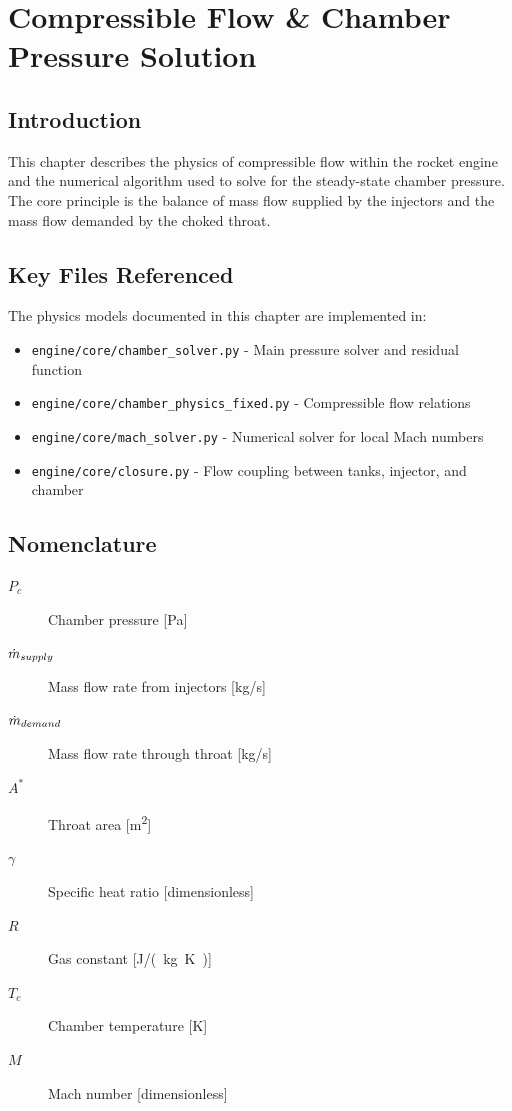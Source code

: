 \section{Compressible Flow \& Chamber Pressure Solution}

\subsection{Introduction}
This chapter describes the physics of compressible flow within the rocket engine and the numerical algorithm used to solve for the steady-state chamber pressure. The core principle is the balance of mass flow supplied by the injectors and the mass flow demanded by the choked throat.

\subsection{Key Files Referenced}
The physics models documented in this chapter are implemented in:
\begin{itemize}
    \item \texttt{engine/core/chamber_solver.py} - Main pressure solver and residual function
    \item \texttt{engine/core/chamber_physics_fixed.py} - Compressible flow relations
    \item \texttt{engine/core/mach_solver.py} - Numerical solver for local Mach numbers
    \item \texttt{engine/core/closure.py} - Flow coupling between tanks, injector, and chamber
\end{itemize}

\subsection{Nomenclature}
\begin{description}
    \item[$P_c$] Chamber pressure [\si{Pa}]
    \item[$\dot{m}_{supply}$] Mass flow rate from injectors [\si{kg/s}]
    \item[$\dot{m}_{demand}$] Mass flow rate through throat [\si{kg/s}]
    \item[$A^*$] Throat area [\si{m^2}]
    \item[$\gamma$] Specific heat ratio [dimensionless]
    \item[$R$] Gas constant [\si{J/(kg.K)}]
    \item[$T_c$] Chamber temperature [\si{K}]
    \item[$M$] Mach number [dimensionless]
\end{description}

